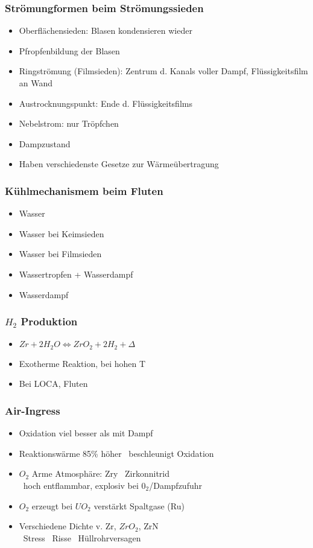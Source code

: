 \documentclass[12pt]{article}
\begin{document}
\subsubsection{Strömungformen beim Strömungssieden}
\begin{itemize}
  \item Oberflächensieden: Blasen kondensieren wieder
  \item Pfropfenbildung der Blasen
  \item Ringströmung (Filmsieden): Zentrum d. Kanals voller Dampf, Flüssigkeitsfilm an Wand
  \item Austrocknungspunkt: Ende d. Flüssigkeitsfilms
  \item Nebelstrom: nur Tröpfchen
  \item Dampzustand
  \item Haben verschiedenste Gesetze zur Wärmeübertragung
\end{itemize}

\subsubsection{Kühlmechanismem beim Fluten}
\begin{itemize}
  \item Wasser
  \item Wasser bei Keimsieden
  \item Wasser bei Filmsieden
  \item Wassertropfen + Wasserdampf
  \item Wasserdampf
\end{itemize}

\subsubsection{\(H_2\) Produktion}
\begin{itemize}
  \item \(Zr + 2 H_2O \Leftrightarrow ZrO_2 + 2 H_2 + \Delta\)
  \item Exotherme Reaktion, bei hohen T
  \item Bei LOCA, Fluten
\end{itemize}

\subsubsection{Air-Ingress}
\begin{itemize}
  \item Oxidation viel besser als mit Dampf
  \item Reaktionswärme 85\% höher \textrightarrow\ beschleunigt Oxidation
  \item \(O_2\) Arme Atmosphäre: Zry \textrightarrow\ Zirkonnitrid\\
  \textrightarrow\ hoch entflammbar, explosiv bei \(0_2\)/Dampfzufuhr
  \item \(O_2\) erzeugt bei \(UO_2\) verstärkt Spaltgase (Ru)
  \item Verschiedene Dichte v. Zr, \(ZrO_2\), ZrN\\
  \textrightarrow\ Stress \textrightarrow\ Risse \textrightarrow\ Hüllrohrversagen
\end{itemize}
\end{document}

